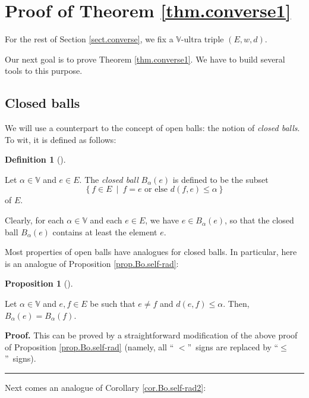\documentclass[numbers=enddot,12pt,final,onecolumn,notitlepage]{scrartcl}%
\theoremstyle{definition}
\newtheorem{prop}[theo]{Proposition}
\newenvironment{proposition}[1][]
{\begin{prop}[#1]\begin{leftbar}}
{\end{leftbar}\end{prop}}
\newtheorem{defi}[theo]{Definition}
\newenvironment{definition}[1][]
{\begin{defi}[#1]\begin{leftbar}}
{\end{leftbar}\end{defi}}
\newenvironment{proof}[1][Proof]{\noindent\textbf{#1.} }{\ \rule{0.5em}{0.5em}}
\renewcommand{\leq}{\leqslant}
\theoremstyle{plainsl}
\begin{document}
\section{\label{sect.converse}Proof of Theorem \ref{thm.converse1}}

For the rest of Section \ref{sect.converse}, we fix a $\mathbb{V}$-ultra
triple $\left(  E,w,d\right)  $.

Our next goal is to prove Theorem \ref{thm.converse1}. We have to build
several tools to this purpose.

\subsection{Closed balls}

We will use a counterpart to the concept of open balls: the notion of
\textit{closed balls}. To wit, it is defined as follows:

\begin{definition}
\label{def.closed-ball}Let $\alpha\in\mathbb{V}$ and $e\in E$. The
\textit{closed ball }$B_{\alpha}\left(  e\right)  $ is defined to be the
subset%
\[
\left\{  f\in E\ \mid\ f=e\text{ or else }d\left(  f,e\right)  \leq
\alpha\right\}
\]
of $E$.
\end{definition}

Clearly, for each $\alpha\in\mathbb{V}$ and each $e\in E$, we have $e\in
B_{\alpha}\left(  e\right)  $, so that the closed ball $B_{\alpha}\left(
e\right)  $ contains at least the element $e$.

Most properties of open balls have analogues for closed balls. In particular,
here is an analogue of Proposition \ref{prop.Bo.self-rad}:

\begin{proposition}
\label{prop.Bc.self-rad}Let $\alpha\in\mathbb{V}$ and $e,f\in E$ be such that
$e\neq f$ and $d\left(  e,f\right)  \leq\alpha$. Then, $B_{\alpha}\left(
e\right)  =B_{\alpha}\left(  f\right)  $.
\end{proposition}

\begin{proof}
This can be proved by a straightforward modification of the above proof of
Proposition \ref{prop.Bo.self-rad} (namely, all \textquotedblleft%
$<$\textquotedblright\ signs are replaced by \textquotedblleft$\leq
$\textquotedblright\ signs).
\end{proof}

Next comes an analogue of Corollary \ref{cor.Bo.self-rad2}:
\end{document}
